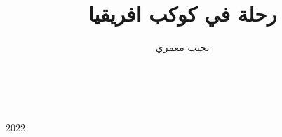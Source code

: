 \documentclass[10pt,oneside,a5paper]{book}%
\title{   رحلة في كوكب افريقيا }
\author{ نجيب معمري  }
\begin{document}

\begin{titlepage}
    \\
        
    \vspace{15mm}
    \\

    \vspace{\fill}
    \centering \large{2022}
\end{titlepage}








\begin{singlespace}\tableofcontents\end{singlespace}

\iftotaltables
\begingroup
\renewcommand*{\addvspace}[1]{}
\begin{singlespace}\listoftables\end{singlespace}
\endgroup
\fi
\iftotalfigures
\begingroup
\renewcommand*{\addvspace}[1]{}
\begin{singlespace}\listoffigures\end{singlespace}
\endgroup
\fi
\iftotalappendixtables\begin{singlespace}\listofappendixtables\end{singlespace}\fi
\iftotalappendixfigures\begin{singlespace}\listofappendixfigures\end{singlespace}\fi







\end{document}
